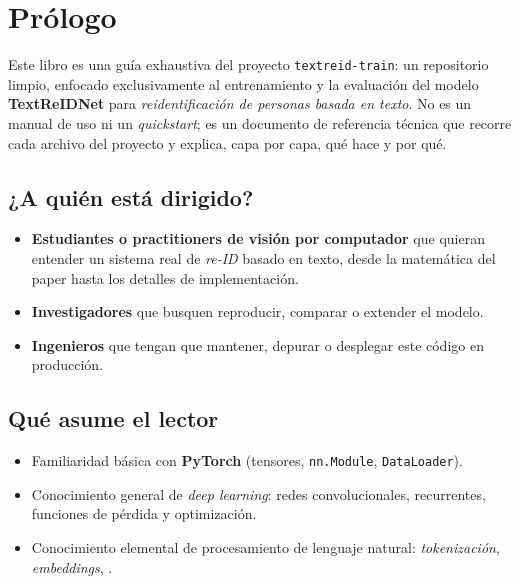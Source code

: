 \chapter{Prólogo}

Este libro es una guía exhaustiva del proyecto \texttt{textreid-train}:
un repositorio limpio, enfocado exclusivamente al entrenamiento y la
evaluación del modelo \textbf{TextReIDNet} para \emph{reidentificación
de personas basada en texto}. No es un manual de uso ni un
\emph{quickstart}; es un documento de referencia técnica que recorre
cada archivo del proyecto y explica, capa por capa, qué hace y por qué.

\section{¿A quién está dirigido?}

\begin{itemize}
  \item \textbf{Estudiantes o practitioners de visión por computador}
        que quieran entender un sistema real de
        \emph{re-ID} basado en texto, desde la matemática del paper
        hasta los detalles de implementación.
  \item \textbf{Investigadores} que busquen reproducir, comparar o
        extender el modelo.
  \item \textbf{Ingenieros} que tengan que mantener, depurar o
        desplegar este código en producción.
\end{itemize}

\section{Qué asume el lector}

\begin{itemize}
  \item Familiaridad básica con \textbf{PyTorch} (tensores,
        \texttt{nn.Module}, \texttt{DataLoader}).
  \item Conocimiento general de \emph{deep learning}: redes
        convolucionales, recurrentes, funciones de pérdida y
        optimización.
  \item Conocimiento elemental de procesamiento de lenguaje natural:
        \emph{tokenización}, \emph{embeddings}, .
\end{itemize}

